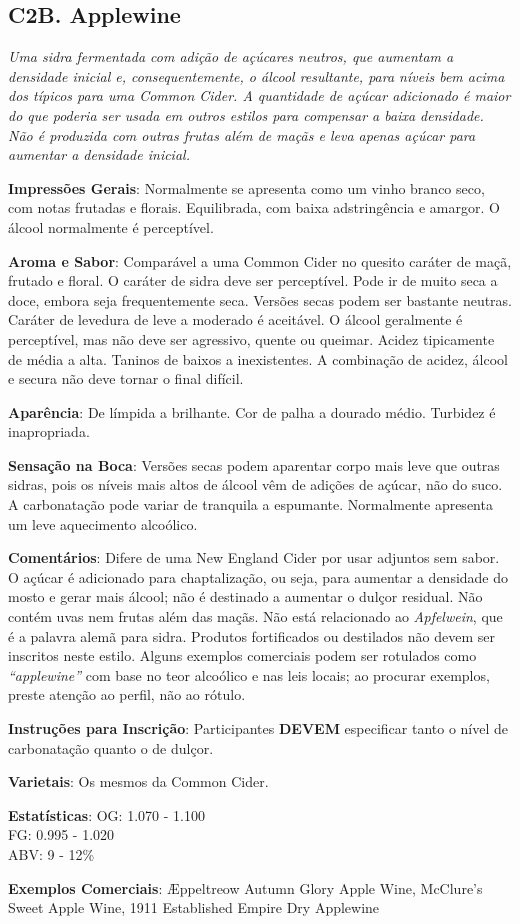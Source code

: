 \subsection*{C2B. Applewine}

\textit{Uma sidra fermentada com adição de açúcares neutros, que aumentam a densidade inicial e, consequentemente, o álcool resultante, para níveis bem acima dos típicos para uma Common Cider. A quantidade de açúcar adicionado é maior do que poderia ser usada em outros estilos para compensar a baixa densidade. Não é produzida com outras frutas além de maçãs e leva apenas açúcar para aumentar a densidade inicial.}

\textbf{Impressões Gerais}: Normalmente se apresenta como um vinho branco seco, com notas frutadas e florais. Equilibrada, com baixa adstringência e amargor. O álcool normalmente é perceptível.

\textbf{Aroma e Sabor}: Comparável a uma Common Cider no quesito caráter de maçã, frutado e floral. O caráter de sidra deve ser perceptível. Pode ir de muito seca a doce, embora seja frequentemente seca. Versões secas podem ser bastante neutras. Caráter de levedura de leve a moderado é aceitável. O álcool geralmente é perceptível, mas não deve ser agressivo, quente ou queimar. Acidez tipicamente de média a alta. Taninos de baixos a inexistentes. A combinação de acidez, álcool e secura não deve tornar o final difícil.

\textbf{Aparência}: De límpida a brilhante. Cor de palha a dourado médio. Turbidez é inapropriada.

\textbf{Sensação na Boca}: Versões secas podem aparentar corpo mais leve que outras sidras, pois os níveis mais altos de álcool vêm de adições de açúcar, não do suco. A carbonatação pode variar de tranquila a espumante. Normalmente apresenta um leve aquecimento alcoólico.

\textbf{Comentários}: Difere de uma New England Cider por usar adjuntos sem sabor. O açúcar é adicionado para chaptalização, ou seja, para aumentar a densidade do mosto e gerar mais álcool; não é destinado a aumentar o dulçor residual. Não contém uvas nem frutas além das maçãs. Não está relacionado ao \textit{Apfelwein}, que é a palavra alemã para sidra. Produtos fortificados ou destilados não devem ser inscritos neste estilo. Alguns exemplos comerciais podem ser rotulados como \textit{“applewine”} com base no teor alcoólico e nas leis locais; ao procurar exemplos, preste atenção ao perfil, não ao rótulo.

\textbf{Instruções para Inscrição}: Participantes \textbf{DEVEM} especificar tanto o nível de carbonatação quanto o de dulçor.

\textbf{Varietais}: Os mesmos da Common Cider.

\textbf{Estatísticas}: OG: 1.070 - 1.100 \\
\phantom{ } \hspace{16.5mm} FG: 0.995 - 1.020 \\
\phantom{ } \hspace{16.5mm} ABV: 9 - 12\%

\textbf{Exemplos Comerciais}: Æppeltreow Autumn Glory Apple Wine, McClure’s Sweet Apple Wine, 1911 Established Empire Dry Applewine

